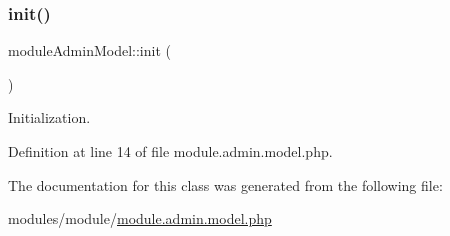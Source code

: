 \subsubsection{\texorpdfstring{init()}{init()}}
{\footnotesize\ttfamily module\+Admin\+Model\+::init (\begin{DoxyParamCaption}{ }\end{DoxyParamCaption})}



Initialization. 



Definition at line 14 of file module.\+admin.\+model.\+php.



The documentation for this class was generated from the following file\+:\begin{DoxyCompactItemize}
\item 
modules/module/\hyperlink{module_8admin_8model_8php}{module.\+admin.\+model.\+php}\end{DoxyCompactItemize}
